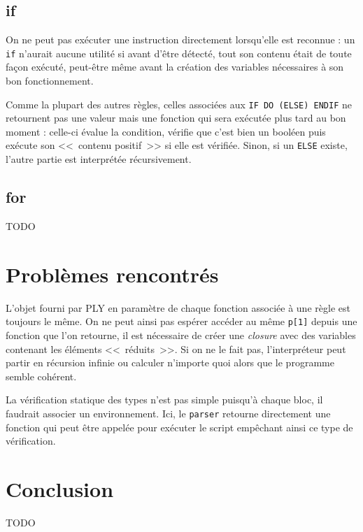 \documentclass[12pt,twocolumn]{article}
\begin{document}
\subsection{if}
On ne peut pas exécuter une instruction directement lorsqu'elle est reconnue :
un \texttt{if} n'aurait aucune utilité si avant d'être détecté, tout son contenu
était de toute façon exécuté, peut-être même avant la création des variables
nécessaires à son bon fonctionnement.

Comme la plupart des autres règles, celles associées aux
\texttt{IF DO (ELSE) ENDIF} ne retournent pas une valeur mais une fonction
qui sera exécutée plus tard au bon moment : celle-ci évalue la condition,
vérifie que c'est bien un booléen puis exécute son <<~contenu positif~>>
si elle est vérifiée. Sinon, si un \texttt{ELSE} existe, l'autre partie est
interprétée récursivement.


\subsection{for}
TODO


\section{Problèmes rencontrés}
L'objet fourni par PLY en paramètre de chaque fonction
associée à une règle est toujours le même. On ne peut ainsi
pas espérer accéder au même \texttt{p[1]} depuis une fonction
que l'on retourne, il est nécessaire de créer une \textit{closure}
avec des variables contenant les éléments <<~réduits~>>.
Si on ne le fait pas, l'interpréteur peut partir en récursion infinie
ou calculer n'importe quoi alors que le programme semble cohérent.

La vérification statique des types n'est pas simple puisqu'à chaque bloc,
il faudrait associer un environnement. Ici, le \texttt{parser} retourne
directement une fonction qui peut être appelée pour exécuter le script
empêchant ainsi ce type de vérification.


\section{Conclusion}
TODO


%
\end{document}

